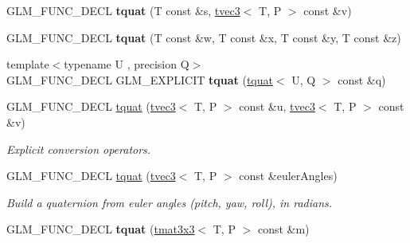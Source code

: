 \begin{DoxyCompactItemize}
\item 
\hypertarget{structglm_1_1tquat_a93d59b2a1a4e282fc1e103e7ad508448}{G\-L\-M\-\_\-\-F\-U\-N\-C\-\_\-\-D\-E\-C\-L {\bfseries tquat} (T const \&s, \hyperlink{structglm_1_1tvec3}{tvec3}$<$ T, P $>$ const \&v)}\label{structglm_1_1tquat_a93d59b2a1a4e282fc1e103e7ad508448}

\item 
\hypertarget{structglm_1_1tquat_ac130dd4ef34a851301a4bdfb14d0c6b7}{G\-L\-M\-\_\-\-F\-U\-N\-C\-\_\-\-D\-E\-C\-L {\bfseries tquat} (T const \&w, T const \&x, T const \&y, T const \&z)}\label{structglm_1_1tquat_ac130dd4ef34a851301a4bdfb14d0c6b7}

\item 
\hypertarget{structglm_1_1tquat_a2595e543aea979bd7db792af742d62d4}{{\footnotesize template$<$typename U , precision Q$>$ }\\G\-L\-M\-\_\-\-F\-U\-N\-C\-\_\-\-D\-E\-C\-L G\-L\-M\-\_\-\-E\-X\-P\-L\-I\-C\-I\-T {\bfseries tquat} (\hyperlink{structglm_1_1tquat}{tquat}$<$ U, Q $>$ const \&q)}\label{structglm_1_1tquat_a2595e543aea979bd7db792af742d62d4}

\item 
G\-L\-M\-\_\-\-F\-U\-N\-C\-\_\-\-D\-E\-C\-L \hyperlink{structglm_1_1tquat_a5c680cd9a6e7de9e5b0fc2e9e096e6a7}{tquat} (\hyperlink{structglm_1_1tvec3}{tvec3}$<$ T, P $>$ const \&u, \hyperlink{structglm_1_1tvec3}{tvec3}$<$ T, P $>$ const \&v)
\begin{DoxyCompactList}\small\item\em Explicit conversion operators. \end{DoxyCompactList}\item 
\hypertarget{structglm_1_1tquat_a9841cfe16ccfb909c4c2cd0956f2d42b}{G\-L\-M\-\_\-\-F\-U\-N\-C\-\_\-\-D\-E\-C\-L \hyperlink{structglm_1_1tquat_a9841cfe16ccfb909c4c2cd0956f2d42b}{tquat} (\hyperlink{structglm_1_1tvec3}{tvec3}$<$ T, P $>$ const \&euler\-Angles)}\label{structglm_1_1tquat_a9841cfe16ccfb909c4c2cd0956f2d42b}

\begin{DoxyCompactList}\small\item\em Build a quaternion from euler angles (pitch, yaw, roll), in radians. \end{DoxyCompactList}\item 
\hypertarget{structglm_1_1tquat_a56ea9f0ac327fc40f99821fd8e0816f8}{G\-L\-M\-\_\-\-F\-U\-N\-C\-\_\-\-D\-E\-C\-L {\bfseries tquat} (\hyperlink{structglm_1_1tmat3x3}{tmat3x3}$<$ T, P $>$ const \&m)}\label{structglm_1_1tquat_a56ea9f0ac327fc40f99821fd8e0816f8}


\end{DoxyCompactItemize}
